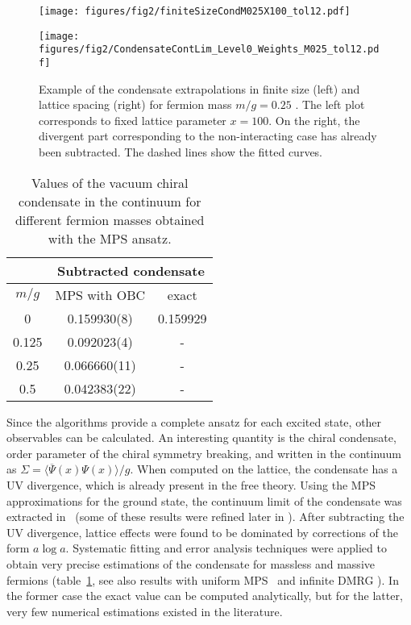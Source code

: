 \documentclass[epj,final]{svjour}
\begin{document}
\begin{figure}
\begin{minipage}[b]{.4\columnwidth}
\texttt{[image: figures/fig2/finiteSizeCondM025X100\_tol12.pdf]}
\end{minipage}
\hspace{.1\columnwidth}
\begin{minipage}[b]{.4\columnwidth} 
\texttt{[image: figures/fig2/CondensateContLim\_Level0\_Weights\_M025\_tol12.pdf]}
\end{minipage}
\caption{Example of the condensate extrapolations in finite size (left) and lattice spacing (right) for fermion mass $m/g=0.25$  \cite{banuls2013matrix}. The left plot corresponds to fixed lattice parameter $x=100$. On the right, the divergent part corresponding to the non-interacting case has already been subtracted. The dashed lines show the fitted curves.}
\label{fig:condMPS}
\end{figure}

\begin{table}
\begin{center}
\begin{tabular}{|c|c|c|}
\hline
&
\multicolumn{2}{|c|}{Subtracted condensate} \\
\hline
$m/g$  & MPS with OBC & exact \\
\hline
0 & 0.159930(8) & 0.159929 \\
\hline
0.125 & 0.092023(4) & - \\
\hline
0.25 &  0.066660(11) & - \\
\hline
0.5 & 0.042383(22) & - \\
\hline
\end{tabular}
\end{center}
\caption{Values of the vacuum chiral condensate in the continuum for different fermion masses obtained with the MPS ansatz.}
\label{tab:condSchw}
\end{table}

Since the algorithms provide a complete ansatz for each excited state, other observables can be calculated. An interesting quantity is the chiral condensate, order parameter of the chiral symmetry breaking, and written in the continuum as $\Sigma=\langle \overline{\Psi}(x) \Psi(x) \rangle/g$. When computed on the lattice, the condensate has a UV divergence, which is already present in the free theory. Using the MPS approximations for the ground state, the continuum limit of the condensate was extracted in~\cite{banuls2013matrix} (some of these results were refined later in \cite{banuls2016thermalmass}). After subtracting the UV divergence, lattice effects were found to be dominated by corrections of the form $a \log a$. Systematic fitting and error analysis techniques were applied to obtain very precise estimations of the condensate for massless and massive fermions (table~\ref{tab:condSchw}, see also results with uniform MPS~\cite{buyens2014pos} and infinite DMRG \cite{zapp2017tensor}). In the former case the exact value can be computed analytically, but for the latter, very few numerical estimations existed in the literature.
\end{document}
